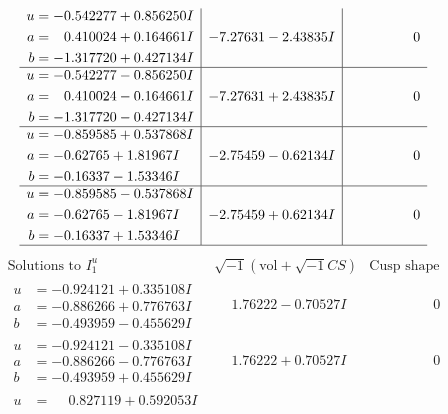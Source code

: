 \documentclass[1p]{elsarticle_modified}
\theoremstyle{definition}
\newcommand{\I}{\sqrt{-1}}
\begin{document}
$$\begin{array}{c|c|c}
\begin{aligned}
u &= -0.542277 + 0.856250 I \\
a &= \phantom{-}0.410024 + 0.164661 I \\
b &= -1.317720 + 0.427134 I\end{aligned}
 & -7.27631 - 2.43835 I & \phantom{-0.000000 } 0 \\ \hline\begin{aligned}
u &= -0.542277 - 0.856250 I \\
a &= \phantom{-}0.410024 - 0.164661 I \\
b &= -1.317720 - 0.427134 I\end{aligned}
 & -7.27631 + 2.43835 I & \phantom{-0.000000 } 0 \\ \hline\begin{aligned}
u &= -0.859585 + 0.537868 I \\
a &= -0.62765 + 1.81967 I \\
b &= -0.16337 - 1.53346 I\end{aligned}
 & -2.75459 - 0.62134 I & \phantom{-0.000000 } 0 \\ \hline\begin{aligned}
u &= -0.859585 - 0.537868 I \\
a &= -0.62765 - 1.81967 I \\
b &= -0.16337 + 1.53346 I\end{aligned}
 & -2.75459 + 0.62134 I & \phantom{-0.000000 } 0\\
 \hline 
 \end{array}$$\newpage$$\begin{array}{c|c|c}  
\text{Solutions to }I^u_{1}& \I (\text{vol} + \sqrt{-1}CS) & \text{Cusp shape}\\
 \hline 
\begin{aligned}
u &= -0.924121 + 0.335108 I \\
a &= -0.886266 + 0.776763 I \\
b &= -0.493959 - 0.455629 I\end{aligned}
 & \phantom{-}1.76222 - 0.70527 I & \phantom{-0.000000 } 0 \\ \hline\begin{aligned}
u &= -0.924121 - 0.335108 I \\
a &= -0.886266 - 0.776763 I \\
b &= -0.493959 + 0.455629 I\end{aligned}
 & \phantom{-}1.76222 + 0.70527 I & \phantom{-0.000000 } 0 \\ \hline\begin{aligned}
u &= \phantom{-}0.827119 + 0.592053 I \\

\end{aligned}
\end{array}$$
\end{document}
